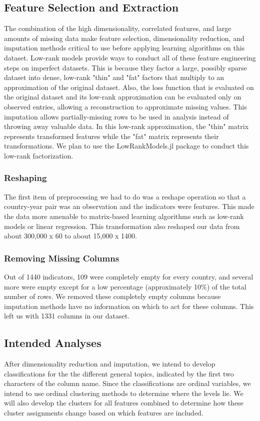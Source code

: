 \documentclass[a4paper]{article}
\begin{document}
\subsection{Feature Selection and Extraction}
The combination of the high dimensionality, correlated features, and large amounts of missing data make feature selection, dimensionality reduction, and imputation methods critical to use before applying learning algorithms on this dataset.
Low-rank models provide ways to conduct all of these feature engineering steps on imperfect datasets. This is because they factor a large, possibly sparse dataset into dense, low-rank "thin" and "fat" factors that multiply to an approximation of the original dataset. Also, the loss function that is evaluated on the original dataset and its low-rank approximation can be evaluated only on observed entries, allowing a reconstruction to approximate missing values. This imputation allows partially-missing rows to be used in analysis instead of throwing away valuable data. In this low-rank approximation, the "thin" matrix represents transformed features while the "fat" matrix represents their transformations. We plan to use the LowRankModels.jl package to conduct this low-rank factorization.
\subsubsection{Reshaping}
The first item of preprocessing we had to do was a reshape operation so that a country-year pair was an observation and the indicators were features. This made the data more amenable to matrix-based learning algorithms such as low-rank models or linear regression. This transformation also reshaped our data from about 300,000 x 60 to about 15,000 x 1400.

\subsubsection{Removing Missing Columns}
Out of 1440 indicators, 109 were completely empty for every country, and several more were empty except for a low percentage (approximately 10\%) of the total number of rows. We removed these completely empty columns because imputation methods have no information on which to act for these columns. This left us with 1331 columns in our dataset.

\subsection{Intended Analyses}
After dimensionality reduction and imputation, we intend to develop classifications for the the different general topics, indicated by the first two characters of the column name. Since the classifications are ordinal variables, we intend to use ordinal clustering methods to determine where the levels lie. We will also develop the clusters for all features combined to determine how these cluster assignments change based on which features are included.
\end{document}
